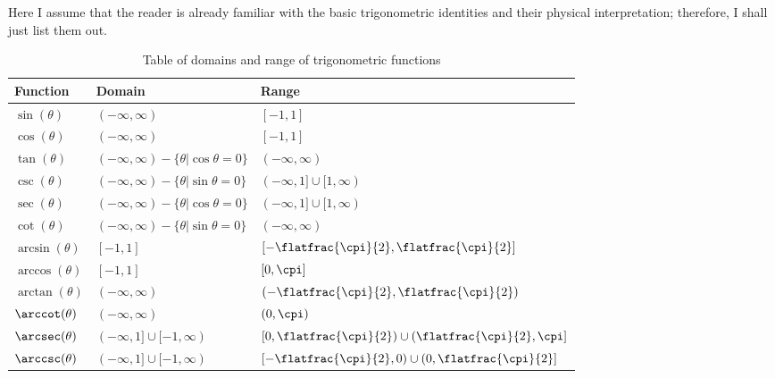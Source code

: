 Here I assume that the reader is already familiar with the basic trigonometric identities and their physical interpretation; therefore, I shall just list them out.
\begin{table}[ht]
    \centering
    \begin{tabular}{l | l | l}
        Function & Domain & Range \\
        \hline
        $\sin(\theta)$ & $(-\infty, \infty)$ & $[-1, 1]$ \\
        $\cos(\theta)$ & $(-\infty, \infty)$ & $[-1, 1]$ \\
        $\tan(\theta)$ & $(-\infty, \infty) - \{\theta | \cos\theta = 0\}$ & $(-\infty, \infty)$ \\
        $\csc(\theta)$ & $(-\infty, \infty) - \{\theta | \sin\theta = 0\}$ & $(-\infty, 1] \cup [1, \infty)$ \\
        $\sec(\theta)$ & $(-\infty, \infty) - \{\theta | \cos\theta = 0\}$ & $(-\infty, 1] \cup [1, \infty)$ \\
        $\cot(\theta)$ & $(-\infty, \infty) - \{\theta | \sin\theta = 0\}$ & $(-\infty, \infty)$ \\
        $\arcsin(\theta)$ & $[-1, 1]$ & $[-\flatfrac{\cpi}{2}, \flatfrac{\cpi}{2}]$ \\
        $\arccos(\theta)$ & $[-1, 1]$ & $[0, \cpi]$ \\
        $\arctan(\theta)$ & $(-\infty, \infty)$ & $(-\flatfrac{\cpi}{2}, \flatfrac{\cpi}{2})$ \\
        $\arccot(\theta)$ & $(-\infty, \infty)$ & $(0, \cpi)$ \\
        $\arcsec(\theta)$ & $(-\infty, 1] \cup [-1, \infty)$ & $[0, \flatfrac{\cpi}{2}) \cup (\flatfrac{\cpi}{2}, \cpi]$ \\
        $\arccsc(\theta)$ & $(-\infty, 1] \cup [-1, \infty)$ & $[-\flatfrac{\cpi}{2}, 0) \cup (0, \flatfrac{\cpi}{2}]$
    \end{tabular}
    \caption{Table of domains and range of trigonometric functions}
\end{table}

